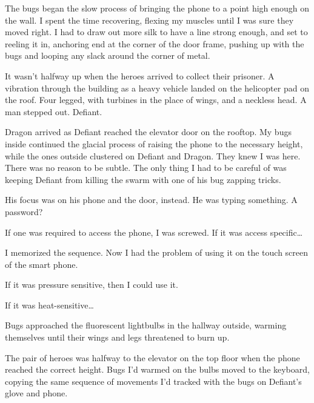 The bugs began the slow process of bringing the phone to a point high enough on the wall.  I spent the time recovering, flexing my muscles until I was sure they moved right.  I had to draw out more silk to have a line strong enough, and set to reeling it in, anchoring end at the corner of the door frame, pushing up with the bugs and looping any slack around the corner of metal.



It wasn't halfway up when the heroes arrived to collect their prisoner.  A vibration through the building as a heavy vehicle landed on the helicopter pad on the roof.  Four legged, with turbines in the place of wings, and a neckless head.  A man stepped out.  Defiant.



Dragon arrived as Defiant reached the elevator door on the rooftop.  My bugs inside continued the glacial process of raising the phone to the necessary height, while the ones outside clustered on Defiant and Dragon.  They knew I was here.  There was no reason to be subtle.  The only thing I had to be careful of was keeping Defiant from killing the swarm with one of his bug zapping tricks.



His focus was on his phone and the door, instead.  He was typing something.  A password?



If one was required to access the phone, I was screwed.  If it was access specific\ldots



I memorized the sequence.  Now I had the problem of using it on the touch screen of the smart phone.



If it was pressure sensitive, then I could use it.



If it was heat-sensitive\ldots



Bugs approached the fluorescent lightbulbs in the hallway outside, warming themselves until their wings and legs threatened to burn up.



The pair of heroes was halfway to the elevator on the top floor when the phone reached the correct height.  Bugs I'd warmed on the bulbs moved to the keyboard, copying the same sequence of movements I'd tracked with the bugs on Defiant's glove and phone.



